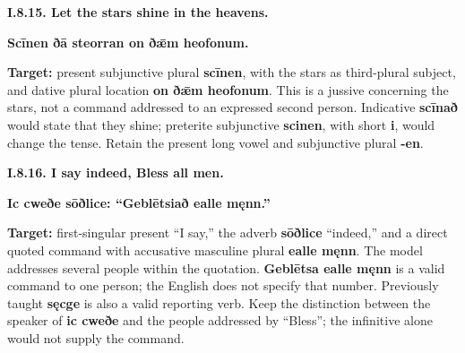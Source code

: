 \par\begin{minipage}{\linewidth}\raggedright
\textbf{I.8.15. Let the stars shine in the heavens.}

\textbf{Scīnen ðā steorran on ðǣm heofonum.}

\textbf{Target:} present subjunctive plural \textbf{scīnen}, with the stars as third-plural subject, and dative plural location \textbf{on ðǣm heofonum}. This is a jussive concerning the stars, not a command addressed to an expressed second person. Indicative \textbf{scīnað} would state that they shine; preterite subjunctive \textbf{scinen}, with short \textbf{i}, would change the tense. Retain the present long vowel and subjunctive plural \textbf{-en}.

\end{minipage}\par\addvspace{4pt}

\par\begin{minipage}{\linewidth}\raggedright
\textbf{I.8.16. I say indeed, Bless all men.}

\textbf{Ic cweðe sōðlice: “Geblētsiað ealle męnn.”}

\textbf{Target:} first-singular present “I say,” the adverb \textbf{sōðlice} “indeed,” and a direct quoted command with accusative masculine plural \textbf{ealle męnn}. The model addresses several people within the quotation. \textbf{Geblētsa ealle męnn} is a valid command to one person; the English does not specify that number. Previously taught \textbf{sęcge} is also a valid reporting verb. Keep the distinction between the speaker of \textbf{ic cweðe} and the people addressed by “Bless”; the infinitive alone would not supply the command.

\end{minipage}\par\addvspace{4pt}

